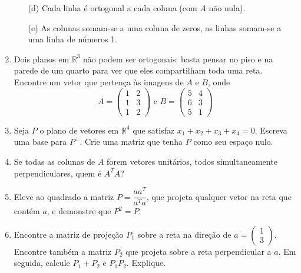 \documentclass[12pt]{article}
\begin{document}
\begin{enumerate}
\begin{itemize}
      \item[(d)] Cada linha é ortogonal a cada coluna (com $A$ não nula).
      \item[(e)] As colunas somam-se a uma coluna de zeros, as linhas somam-se a uma linha de números 1.
   \end{itemize}
   \item Dois planos em $\mathbb{R}^3$ não podem ser ortogonais: basta pensar no piso e na parede de um quarto para ver que eles compartilham toda uma reta. Encontre um vetor que pertença às imagens de $A$ e $B$, onde
   \begin{equation*}
      A =
      \begin{pmatrix}
         1 & 2\\
         1 & 3\\
         1 & 2
      \end{pmatrix}
      \mbox{ e } B =
      \begin{pmatrix}
         5 & 4\\
         6 & 3\\
         5 & 1
      \end{pmatrix}
   \end{equation*}
   \item Seja $P$ o plano de vetores em $\mathbb{R}^4$ que satisfaz $x_1+x_2+x_3+x_4 = 0$. Escreva uma base para $P^{\perp}$. Crie uma matriz que tenha $P$ como seu espaço nulo.
   \item Se todas as colunas de $A$ forem vetores unitários, todos simultaneamente perpendiculares, quem é $A^TA$?
   \item Eleve ao quadrado a matriz $P = \dfrac{aa^T}{a^Ta}$, que projeta qualquer vetor na reta que contém $a$, e demonstre que $P^2=P$.
   \item Encontre a matriz de projeção $P_1$ sobre a reta na direção de $a=
   \begin{pmatrix}
      1\\3
   \end{pmatrix}$. Encontre também a matriz $P_2$ que projeta sobre a reta perpendicular a $a$. Em seguida, calcule $P_1+P_2$ e $P_1P_2$. Explique.


\end{enumerate}
\end{document}
